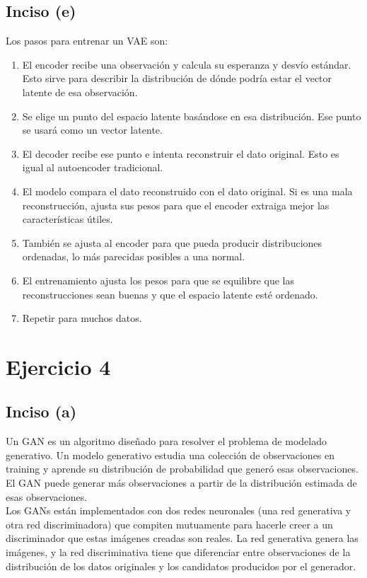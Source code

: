 \documentclass[12pt, a4paper]{article}
\begin{document}
        \subsection*{Inciso (e)}
            \noindent Los pasos para entrenar un VAE son:
            \begin{enumerate}
                \item El encoder recibe una observación y calcula su esperanza y desvío estándar. Esto sirve para describir la distribución de dónde podría estar el vector latente de esa observación.
                \item Se elige un punto del espacio latente basándose en esa distribución. Ese punto se usará como un vector latente.
                \item El decoder recibe ese punto e intenta reconstruir el dato original. Esto es igual al autoencoder tradicional.
                \item El modelo compara el dato reconstruido con el dato original. Si es una mala reconstrucción, ajusta sus pesos para que el encoder extraiga mejor las características útiles.
                \item También se ajusta al encoder para que pueda producir distribuciones ordenadas, lo más parecidas posibles a una normal.
                \item El entrenamiento ajusta los pesos para que se equilibre que las reconstrucciones sean buenas y que el espacio latente esté ordenado.
                \item Repetir para muchos datos.
            \end{enumerate}
    \section*{Ejercicio 4}
        \subsection*{Inciso (a)}
            \noindent Un GAN es un algoritmo diseñado para resolver el problema de modelado generativo. Un modelo generativo estudia una colección de observaciones en training y aprende su distribución de probabilidad que generó esas observaciones. El GAN puede generar más observaciones a partir de la distribución estimada de esas observaciones. \\

            \noindent Los GANs están implementados con dos redes neuronales (una red generativa y otra red discriminadora) que compiten mutuamente para hacerle creer a un discriminador que estas imágenes creadas son reales. La red generativa genera las imágenes, y la red discriminativa tiene que diferenciar entre observaciones de la distribución de los datos originales y los candidatos producidos por el generador. \\
\end{document}
